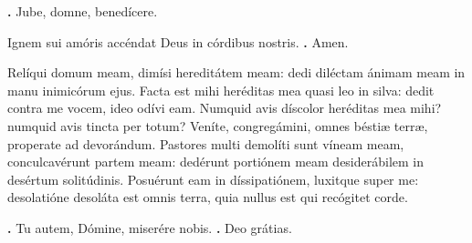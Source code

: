 \begin{small}
\textbf{\Vbar.} Jube, domne, benedícere.

Ignem sui amóris accéndat Deus in córdibus nostris. \textbf{\Rbar.} Amen.
\end{small}


Relíqui domum meam, dimísi hereditátem meam: dedi diléctam ánimam meam in manu inimicórum ejus.
Facta est mihi heréditas mea quasi leo in silva: dedit contra me vocem, ideo odívi eam.
Numquid avis díscolor heréditas mea mihi? numquid avis tincta per totum? Veníte, congregámini, omnes béstiæ terræ, properate ad devorándum.
Pastores multi demolíti sunt víneam meam, conculcavérunt partem meam: dedérunt portiónem meam desiderábilem in desértum solitúdinis.
Posuérunt eam in díssipatiónem, luxitque super me: desolatióne desoláta est omnis terra, quia nullus est qui recógitet corde.

\textbf{\Vbar.} Tu autem, Dómine, miserére nobis.
\textbf{\Rbar.} Deo grátias.

